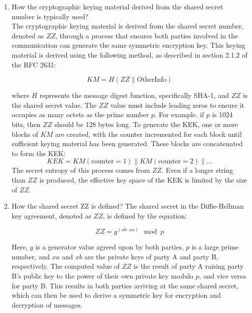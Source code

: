 \documentclass{article}
\begin{document}
\begin{enumerate}
    \item How the cryptographic keying material derived from the shared secret number is typically used?\\
    The cryptographic keying material is derived from the shared secret number, denoted as $ZZ$, through a process that ensures both parties involved in the communication can generate the same symmetric encryption key. This keying material is derived using the following method, as described in section 2.1.2 of the RFC 2631:

    \begin{equation*}
        KM = H(ZZ \parallel \text{OtherInfo})
    \end{equation*}

    where $H$ represents the message digest function, specifically SHA-1, and $ZZ$ is the shared secret value. The $ZZ$ value must include leading zeros to ensure it occupies as many octets as the prime number $p$. For example, if $p$ is 1024 bits, then $ZZ$ should be 128 bytes long.
    To generate the KEK, one or more blocks of $KM$ are created, with the counter incremented for each block until sufficient keying material has been generated. These blocks are concatenated to form the KEK:
    \begin{equation*}
        KEK = KM(\text{counter}=1) \parallel KM(\text{counter}=2) \parallel \ldots
    \end{equation*}
    The secret entropy of this process comes from $ZZ$.
    Even if a longer string than $ZZ$ is produced, the effective key space of the KEK is limited by the size of $ZZ$.
    \item How the shared secret ZZ is defined?
    The shared secret in the Diffie-Hellman key agreement, denoted as \( ZZ \), is defined by the equation:

    \begin{equation*}
        ZZ = g^{(xb \cdot xa)} \mod p
    \end{equation*}

    Here, \( g \) is a generator value agreed upon by both parties, \( p \) is a large prime number, and \( xa \) and \( xb \) are the private keys of party A and party B, respectively. The computed value of \( ZZ \) is the result of party A raising party B's public key to the power of their own private key modulo \( p \), and vice versa for party B. This results in both parties arriving at the same shared secret, which can then be used to derive a symmetric key for encryption and decryption of messages.



\end{enumerate}
\end{document}

